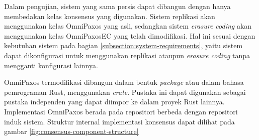 Dalam pengujian, sistem yang sama persis dapat dibangun dengan hanya membedakan kelas konsensus yang digunakan. Sistem replikasi akan menggunakan kelas OmniPaxos yang asli, sedangkan sistem \textit{erasure coding} akan menggunakan kelas OmniPaxosEC yang telah dimodifikasi. Hal ini sesuai dengan kebutuhan sistem pada bagian \ref{subsection:system-requirements}, yaitu sistem dapat dikonfigurasi untuk menggunakan replikasi ataupun \textit{erasure coding} tanpa mengganti konfigurasi lainnya.

OmniPaxos termodifikasi dibangun dalam bentuk \textit{package} atau dalam bahasa pemrograman Rust, menggunakan \textit{crate}. Pustaka ini dapat digunakan sebagai pustaka independen yang dapat diimpor ke dalam proyek Rust lainnya. Implementasi OmniPaxos berada pada repositori berbeda dengan repositori induk sistem. Struktur internal implementasi konsensus dapat dilihat pada gambar \ref{fig:consensus-component-structure}
